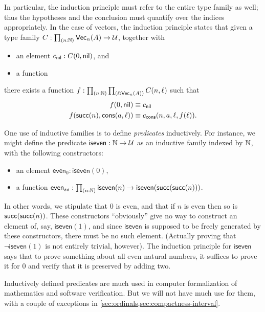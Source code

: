 In particular, the induction principle must refer to the entire type family as well; thus the hypotheses and the conclusion must quantify over the indices appropriately.
In the case of vectors, the induction principle states that given a type family $C:\prd{n:\nat} \vect n A \to \type$, together with
\begin{itemize}
\item an element $c_{\mathsf{nil}} : C(0,\mathsf{nil})$, and
\item a function 
\end{itemize}
there exists a function $f:\prd{n:\nat}{\ell:\vect n A} C(n,\ell)$ such that
\begin{align*}
  f(0,\mathsf{nil}) &\equiv c_{\mathsf{nil}}\\
  f(\mathsf{succ}(n),\mathsf{cons}(a,\ell)) &\equiv c_{\mathsf{cons}}(n,a,\ell,f(\ell)).
\end{align*}

%
%
One use of inductive families is to define \emph{predicates} inductively.
For instance, we might define the predicate $\mathsf{iseven}:\mathbb{N}\to\mathcal{U}$ as an inductive family indexed by $\mathbb{N}$, with the following constructors:
\begin{itemize}
\item an element $\mathsf{even}_0 : \mathsf{iseven}(0)$,
\item a function $\mathsf{even}_{ss} : \prd{n:\nat} \mathsf{iseven}(n) \to \mathsf{iseven}(\suc(\suc(n)))$.
\end{itemize}
In other words, we stipulate that $0$ is even, and that if $n$ is even then so is $\mathsf{succ}(\mathsf{succ}(n))$.
These constructors ``obviously'' give no way to construct an element of, say, $\mathsf{iseven}(1)$, and since $\mathsf{iseven}$ is supposed to be freely generated by these constructors, there must be no such element.
(Actually proving that $\neg \mathsf{iseven}(1)$ is not entirely trivial, however).
The induction principle for $\mathsf{iseven}$ says that to prove something about all even natural numbers, it suffices to prove it for $0$ and verify that it is preserved by adding two.

%
Inductively defined predicates are much used in computer formalization of mathematics and software verification.
But we will not have much use for them, with a couple of exceptions in \autoref{sec:ordinals,sec:compactness-interval}.

